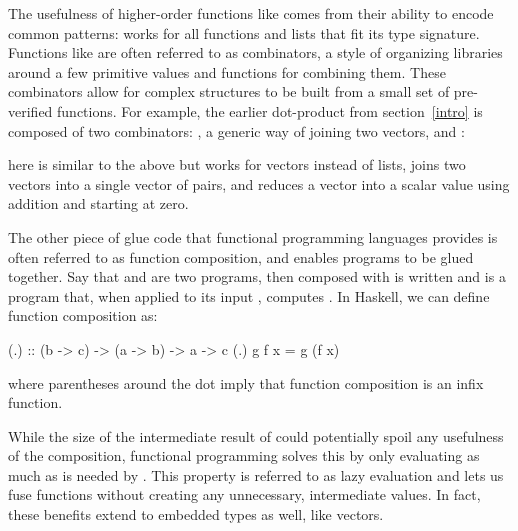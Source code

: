 \documentclass[../paper.tex]{subfiles}
\begin{document}
The usefulness of higher-order functions like  comes from their ability to encode common patterns:  works for all functions and lists that fit its type signature. Functions like  are often referred to as combinators, a style of organizing libraries around a few primitive values and functions for combining them. These combinators allow for complex structures to be built from a small set of pre-verified functions. For example, the earlier dot-product from section~\ref{intro} is composed of two combinators: , a generic way of joining two vectors, and :



\noindent {} here is similar to the above  but works for vectors instead of lists,  joins two vectors into a single vector of pairs, and  reduces a vector into a scalar value using addition and starting at zero.


The other piece of glue code that functional programming languages provides is often referred to as function composition, and enables programs to be glued together. Say that  and  are two programs, then  composed with  is written  and is a program that, when applied to its input , computes . In Haskell, we can define function composition as:

\begin{code}
(.) :: (b -> c) -> (a -> b) -> a -> c
(.) g f x = g (f x)
\end{code}

\noindent where parentheses around the dot imply that function composition is an infix function.

While the size of the intermediate result of  could potentially spoil any usefulness of the composition, functional programming solves this by only evaluating  as much as is needed by . This property is referred to as lazy evaluation and lets us fuse functions without creating any unnecessary, intermediate values. In fact, these benefits extend to embedded types as well, like vectors.
\end{document}
